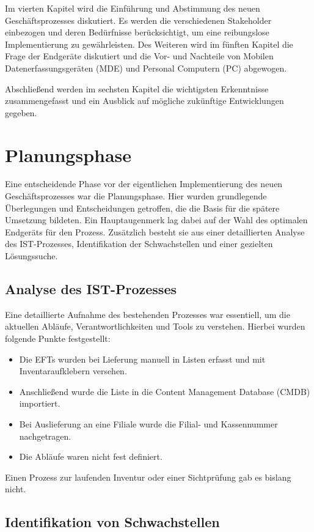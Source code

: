 \documentclass[12pt, a4paper]{article}
\begin{document}
Im vierten Kapitel wird die Einführung und Abstimmung des neuen Geschäftsprozesses diskutiert. Es werden die verschiedenen Stakeholder einbezogen und deren Bedürfnisse 
berücksichtigt, um eine reibungslose Implementierung zu gewährleisten. Des Weiteren wird im fünften Kapitel die Frage der Endgeräte diskutiert und die Vor- und Nachteile 
von Mobilen Datenerfassungsgeräten (MDE) und Personal Computern (PC) abgewogen.

Abschließend werden im sechsten Kapitel die wichtigsten Erkenntnisse zusammengefasst und ein Ausblick auf mögliche zukünftige Entwicklungen gegeben.

\section{Planungsphase}

Eine entscheidende Phase vor der eigentlichen Implementierung des neuen Geschäftsprozesses war die Planungsphase. Hier wurden grundlegende Überlegungen und Entscheidungen 
getroffen, die die Basis für die spätere Umsetzung bildeten. Ein Hauptaugenmerk lag dabei auf der Wahl des optimalen Endgeräts für den Prozess.
Zusätzlich besteht sie aus einer detaillierten Analyse des IST-Prozesses, Identifikation der Schwachstellen und einer gezielten Lösungssuche.

\subsection{Analyse des IST-Prozesses}

Eine detaillierte Aufnahme des bestehenden Prozesses war essentiell, um die aktuellen Abläufe, Verantwortlichkeiten und Tools zu verstehen. Hierbei wurden folgende Punkte 
festgestellt:
\begin{itemize}
\item Die EFTs wurden bei Lieferung manuell in Listen erfasst und mit Inventaraufklebern versehen.
\item Anschließend wurde die Liste in die Content Management Database (CMDB) importiert.
\item Bei Auslieferung an eine Filiale wurde die Filial- und Kassennummer nachgetragen.
\item Die Abläufe waren nicht fest definiert.
\end{itemize}
Einen Prozess zur laufenden Inventur oder einer Sichtprüfung gab es bislang nicht.

\subsection{Identifikation von Schwachstellen}
\end{document}
